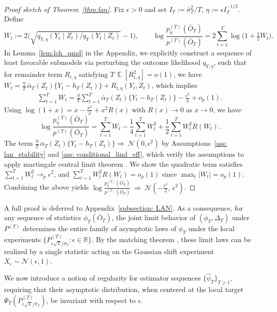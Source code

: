 \documentclass[11pt]{article}
\DeclareMathOperator{\E}{\mathbb{E}}
\begin{document}
\begin{proof}[Proof sketch of Theorem~\ref{thm:lan}]
Fix $\epsilon>0$ and set $I_T:=\bar{\sigma}_T^2/T$, $\eta:=\epsilon I_T^{-1/2}$.
Define
\[
W_t:=2\Big(\sqrt{q_{Y,\eta}(Y_t\mid Z_t)/q_Y(Y_t\mid Z_t)}-1\Big),
\qquad
\log\frac{p^{(T)}_\eta(\bar O_T)}{p^{(T)}(\bar O_T)}
=2\sum_{t=1}^T \log\Big(1+\tfrac12 W_t\Big).
\]
In Lemma~\ref{lem:lch_qmd} in the Appendix, we explicitly construct a sequence of least favorable submodels via perturbing the outcome likelihood $q_{Y, \eta}$, such that for remainder term $R_{t, \eta}$ satisfying $T\,\E[R_{t,\eta}^2]=o(1)$, we have $W_t=\frac{\eta}{T}\,\bar\alpha_T(Z_t)\{Y_t-h_T(Z_t)\}+R_{t,\eta}(Y_t,Z_t)$, 
which implies 
\begin{align*}
    \sum_{t=1}^T W_t
=
\frac{\eta}{T}\sum_{t=1}^T \bar\alpha_T(Z_t)\{Y_t-h_T(Z_t)\}
-\frac{\epsilon^2}{4}
+o_p(1). 
\end{align*}
Using $\log(1+x)=x-\frac{x^2}{2}+x^2R(x)$ with $R(x)\to0$ as $x\to0$, we have
\[
\log\frac{p^{(T)}_\eta(\bar{O}_T)}{p^{(T)}(\bar{O}_T)}
=
\sum_{t=1}^T W_t-\frac14\sum_{t=1}^T W_t^2+\frac12\sum_{t=1}^T W_t^2R(W_t).
\]
The term $\frac{\eta}{T}\,\bar\alpha_T(Z_t)\{Y_t-h_T(Z_t)\} \Rightarrow\ \mathcal N(0,\epsilon^2)$ by Assumptions~\ref{ass: lan_stability} and \ref{ass: conditional_lind_eff}, which verify the assumptions to apply martingale central limit theorem \citep[Theorem 3.2]{hall1980}. We show the quadratic term satisfies $\sum_{t=1}^T W_t^2\to_p \epsilon^2$, and $\sum_{t=1}^T W_t^2R(W_t)=o_p(1)$ since $\max_t|W_t|=o_p(1)$. Combining the above yields $\log\frac{p^{(T)}_\eta(\bar O_T)}{p^{(T)}(\bar O_T)}
\ \Rightarrow\ \mathcal N\!\left(-\frac{\epsilon^2}{2},\,\epsilon^2\right)$. 
\end{proof}
A full proof is deferred to Appendix~\ref{subsection: LAN}. As a consequence, for any sequence of statistics $\phi_T(\bar O_T)$,
the joint limit behavior of $(\phi_T,\Delta_T)$ under $P^{(T)}$
determines the entire family of asymptotic laws of $\phi_T$ under the
local experiments
$\{P^{(T)}_{\epsilon\sqrt T/\bar \sigma_T}:\epsilon\in\mathbb R\}$.
By the matching theorem \citep[Theorem 7.10]{vanderVaart1998asymptotic}, these limit laws can be realized by a single statistic acting on the Gaussian shift experiment
$X_\epsilon\sim\mathcal N(\epsilon,1)$.

We now introduce a notion of regularity for estimator sequences
$\{\widehat\psi_T\}_{T\ge1}$, requiring that their asymptotic distribution,
when centered at the local target
$\Psi_T(P^{(T)}_{\epsilon\sqrt T/\bar \sigma_T})$,
be invariant with respect to $\epsilon$.
\end{document}
